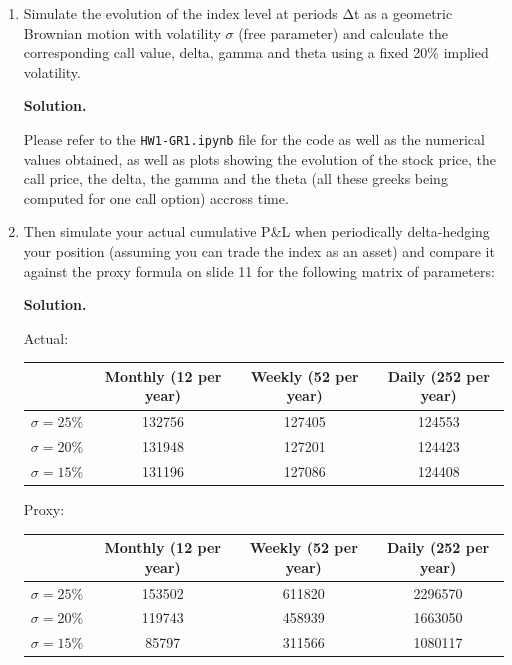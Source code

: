 \documentclass[12pt]{article}
\newenvironment{solution}{\vspace{0.2cm} \textbf{Solution.}}{}
\begin{document}
	\begin{enumerate}[label=(\alph*)]
		\item Simulate the evolution of the index level at periods Δt as a geometric Brownian motion with volatility $\sigma$ (free parameter) and calculate the corresponding call value, delta, gamma and theta using a fixed 20\% implied volatility.
		
		\begin{solution}
		
		Please refer to the \verb|HW1-GR1.ipynb| file for the code as well as the numerical values obtained, as well as plots showing the evolution of the stock price, the call price, the delta, the gamma and the theta (all these greeks being computed for one call option) accross time.
	
		\end{solution}
		\item Then simulate your actual cumulative P\&L when periodically delta-hedging your position (assuming you can trade the index as an asset) and compare it against the proxy formula on slide 11 for the following matrix of parameters:
			
		\begin{solution}
			
		Actual:
		
		\linethickness{1pt}
		\setlength{\arrayrulewidth}{1pt}
		\begin{tabular}{|c|c|c|c|}
			\hline
			\backslashbox{$\sigma$}{$\Delta t$} & Monthly (12 per year) & Weekly (52 per year) & Daily (252 per year) \\ \hline
			$\sigma = 25 \%$ & 132756 & 127405 & 124553 \\ \hline
			$\sigma = 20 \%$ & 131948 & 127201 & 124423 \\ \hline
			$\sigma = 15 \%$ & 131196 & 127086 & 124408 \\ \hline
		\end{tabular}
	
		\newpage
	
		Proxy:
		
		\linethickness{1pt}
		\setlength{\arrayrulewidth}{1pt}
		\begin{tabular}{|c|c|c|c|}
			\hline
			\backslashbox{$\sigma$}{$\Delta t$} & Monthly (12 per year) & Weekly (52 per year) & Daily (252 per year) \\ \hline
			$\sigma = 25 \%$ & 153502 & 611820  & 2296570 \\ \hline
			$\sigma = 20 \%$ & 119743 & 458939 & 1663050 \\ \hline
			$\sigma = 15 \%$ & 85797 & 311566 & 1080117 \\ \hline
		\end{tabular} 


\end{solution}
\end{enumerate}
\end{document}
